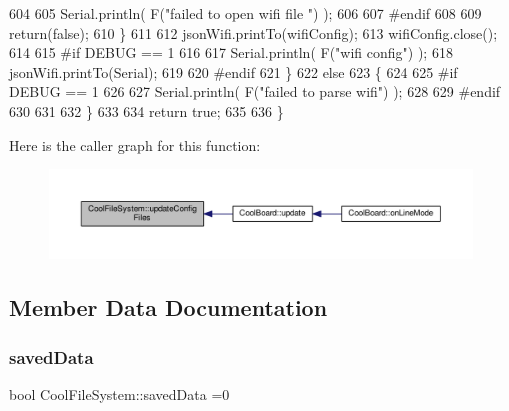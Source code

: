 \begin{DoxyCode}
604 
605             Serial.println( F(\textcolor{stringliteral}{"failed to open wifi file "}) );
606         
607 \textcolor{preprocessor}{        #endif}
608         
609             \textcolor{keywordflow}{return}(\textcolor{keyword}{false});
610         \}
611 
612         jsonWifi.printTo(wifiConfig);
613         wifiConfig.close();
614 
615 \textcolor{preprocessor}{#if DEBUG == 1 }
616 
617         Serial.println( F(\textcolor{stringliteral}{"wifi config"}) );
618         jsonWifi.printTo(Serial);
619 
620 \textcolor{preprocessor}{#endif}
621     \}
622     \textcolor{keywordflow}{else}
623     \{
624 
625 \textcolor{preprocessor}{    #if DEBUG == 1 }
626 
627         Serial.println( F(\textcolor{stringliteral}{"failed to parse wifi"}) );
628     
629 \textcolor{preprocessor}{    #endif}
630 
631     
632     \}   
633         
634     \textcolor{keywordflow}{return} \textcolor{keyword}{true};
635 
636 \}   
\end{DoxyCode}
Here is the caller graph for this function\+:\nopagebreak
\begin{figure}[H]
\begin{center}
\leavevmode
\includegraphics[width=350pt]{classCoolFileSystem_a32dad79ae80182a83e2e8f52286b7c7b_icgraph}
\end{center}
\end{figure}


\subsection{Member Data Documentation}
\mbox{\label{classCoolFileSystem_ad398e0c5c41a0c88acdf5d672aa71351}} 
\subsubsection{\texorpdfstring{saved\+Data}{savedData}}
{\footnotesize\ttfamily bool Cool\+File\+System\+::saved\+Data =0\hspace{0.3cm}{\ttfamily [private]}}



